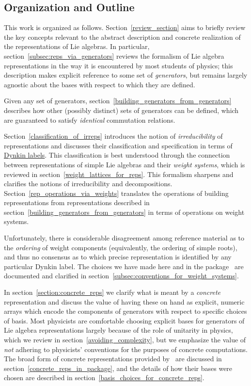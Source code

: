 \documentclass[12pt,a4paper]{article}\let\ifpdf\relax
\begin{document}
\subsection{Organization and Outline}\vspace{-4pt}

This work is organized as follows. \mbox{Section~\ref{review_section}} aims to {briefly} review the key concepts relevant to the abstract description and concrete realization of the representations of Lie algebras. In particular, \mbox{section~\ref{subsec:reps_via_generators}} reviews the formalism of Lie algebra representations in the way it is encountered by most students of physics; this description makes explicit reference to some set of \emph{generators}, but remains largely agnostic about the bases with respect to which they are defined. 

Given any set of generators, \mbox{section \ref{building_generators_from_generators}} describes how other (possibly distinct) sets of generators can be defined, which are guaranteed to satisfy \emph{identical} commutation relations.

\mbox{Section~\ref{classification_of_irreps}} introduces the notion of \emph{irreducibility} of representations and discusses their classification and specification in terms of \hyperlink{label:w}{Dynkin labels}. This classification is best understood through the connection between representations of simple Lie algebras and their \emph{weight systems}, which is reviewed in \mbox{section~\ref{weight_lattices_for_reps}}. This formalism sharpens and clarifies the notions of irreducibility and decompositions. \mbox{Section~\ref{rep_operations_via_weights}} translates the operations of building representations from representations described in  \mbox{section~\ref{building_generators_from_generators}} in terms of operations on weight systems. 

\newpage
Unfortunately, there is considerable disagreement among reference material as to the \emph{ordering} of weight components (equivalently, the ordering of simple roots), and thus no consensus as to which precise representation is identified by any particular Dynkin label. The choices we have made here and in the package \rpackage~are documented and clarified in \mbox{section~\ref{subsec:conventions_for_weight_systems}}.

In \mbox{section~\ref{section:concrete_reps}} we clarify what is meant by a \emph{concrete} representation and discuss the value of having these on hand as explicit, numeric arrays which encode the components of generators with respect to specific choices of basis. Most physicists are comfortable choosing explicit bases for generators of Lie algebra representations largely because of the role of unitarity in physics, which we review in \mbox{section~\ref{avoiding_complexity}}, but we emphasize the value of \emph{not} adhering to physicists' conventions for the purposes of concrete computations. The broad form of concrete representations provided by \rpackage~are discussed in \mbox{section~\ref{concrete_reps_in_package}}, and the details of how their bases were chosen are described in \mbox{section~\ref{basis_choices_for_concrete_reps}}.
\end{document}
